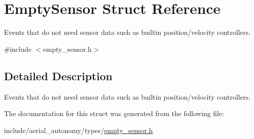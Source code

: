 \hypertarget{structEmptySensor}{\section{Empty\-Sensor Struct Reference}
\label{structEmptySensor}
}


Events that do not need sensor data such as builtin position/velocity controllers.  




{\ttfamily \#include $<$empty\-\_\-sensor.\-h$>$}



\subsection{Detailed Description}
Events that do not need sensor data such as builtin position/velocity controllers. 

The documentation for this struct was generated from the following file\-:\begin{DoxyCompactItemize}
\item 
include/aerial\-\_\-autonomy/types/\hyperlink{empty__sensor_8h}{empty\-\_\-sensor.\-h}\end{DoxyCompactItemize}
